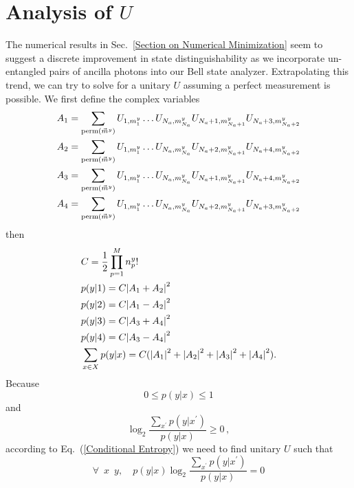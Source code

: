 \documentclass[aps,pra,twocolumn,showpacs,superscriptaddress,floatfix,10pt]{revtex4}
\begin{document}
\section{Analysis of $U$}
\label{Section on U Analysis}
The numerical results in Sec.~\ref{Section on Numerical Minimization} seem to suggest a discrete improvement in state distinguishability as we incorporate un-entangled pairs of ancilla photons into our Bell state analyzer. Extrapolating this trend, we can try to solve for a unitary $U$ assuming a perfect measurement is possible. 
We first define the complex variables
\begin{eqnarray}
	\small{ A_1 = \sum\limits_{\textrm{perm}(\vec{m}^y)} U_{1,m^y_1} \dots U_{N_a,m^y_{N_a}} U_{N_a+1,m^y_{N_a+1}} U_{N_a+3,m^y_{N_a+2}}} \nonumber\\
	 A_2 = \sum\limits_{\textrm{perm}(\vec{m}^y)} U_{1,m^y_1} \dots U_{N_a,m^y_{N_a}} U_{N_a+2,m^y_{N_a+1}} U_{N_a+4,m^y_{N_a+2}} \nonumber\\
	 A_3 = \sum\limits_{\textrm{perm}(\vec{m}^y)} U_{1,m^y_1} \dots U_{N_a,m^y_{N_a}} U_{N_a+1,m^y_{N_a+1}} U_{N_a+4,m^y_{N_a+2}} \nonumber\\
	 A_4 = \sum\limits_{\textrm{perm}(\vec{m}^y)} U_{1,m^y_1} \dots U_{N_a,m^y_{N_a}} U_{N_a+2,m^y_{N_a+1}} U_{N_a+3,m^y_{N_a+2}} \nonumber
\end{eqnarray}
then
\begin{eqnarray}
	& C = \frac{1}{2}\prod_{p=1}^{M} n^y_p! \nonumber \\
	& p(y|1) = C \abs{A_1 + A_2}^2\nonumber \\
	& p(y|2) = C \abs{A_1 - A_2}^2 \\
	& p(y|3) = C \abs{A_3 + A_4}^2 \nonumber\\
	& p(y|4) = C \abs{A_3 - A_4}^2 \nonumber\\
	& \sum_{x \in X} p(y|x) = C(\abs{A_1}^2 + \abs{A_2}^2 + \abs{A_3}^2 + \abs{A_4}^2 ). \nonumber
\end{eqnarray}
Because 
\begin{equation}
	0 \le p(y|x) \le 1
\end{equation}
and
\begin{equation}
	\log_2 \frac{\sum_{x^\prime} p(y|x^\prime)}{p(y|x)} \ge 0 \,,
\end{equation}
according to Eq.~(\ref{Conditional Entropy}) we need to find unitary $U$ such that
\begin{equation}
\label{Conditional Entropy Condition}
	\forall \enspace x \enspace y , \quad p(y|x) \log_2 \frac{\sum_{x^\prime} p(y|x^\prime)}{p(y|x)} = 0
\end{equation}
\end{document}
